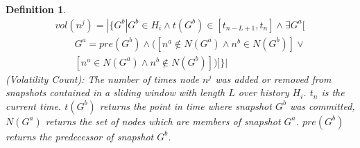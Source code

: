\documentclass[abstracton,12pt]{scrreprt}
\newtheorem{definition}{Definition}
\begin{document}
\begin{definition}
    \begin{equation}
        \begin{split}
            vol(n^j) = | \{ G^b | G^b \in H_i \land t(G^b) \in [t_{n-L+1}, t_n] \land \exists G^a[ \\
            \qquad G^a = pre(G^b) \land ([n^a \notin N(G^a) \land n^b \in N(G^b)]\lor \\
            \qquad [n^a \in N(G^a) \land n^b \notin N(G^b)] )]\} |
        \end{split}
    \end{equation}
    (Volatility Count): The number of times node $n^j$ was added or removed from snapshots contained in a sliding window with length $L$ over history $H_i$.
    $t_n$ is the current time.
    $t(G^b)$ returns the point in time where snapshot $G^b$ was committed, $N(G^a)$ returns the set of nodes which are members of snapshot $G^a$.
    $pre(G^b)$ returns the predecessor of snapshot $G^b$.
    \label{def:vol_count}
\end{definition}
\end{document}
